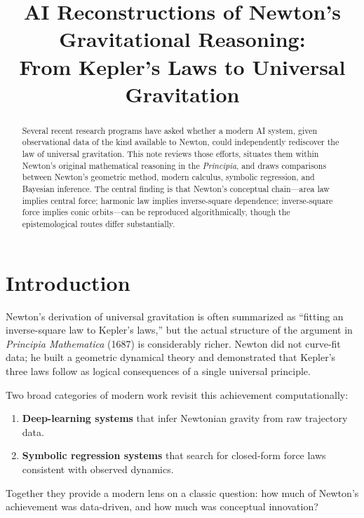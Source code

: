 \documentclass[12pt]{article}
\title{AI Reconstructions of Newton's Gravitational Reasoning:\\
From Kepler's Laws to Universal Gravitation}
\author{}
\date{}
\begin{document}
\maketitle

\begin{abstract}
Several recent research programs have asked whether a modern AI system,
given observational data of the kind available to Newton, could independently
rediscover the law of universal gravitation.
This note reviews those efforts, situates them within Newton's original
mathematical reasoning in the \textit{Principia}, and draws comparisons
between Newton's geometric method, modern calculus, symbolic regression,
and Bayesian inference.
The central finding is that Newton's conceptual chain---area law implies
central force; harmonic law implies inverse-square dependence; inverse-square
force implies conic orbits---can be reproduced algorithmically, though the
epistemological routes differ substantially.
\end{abstract}

\section{Introduction}

Newton's derivation of universal gravitation is often summarized as
``fitting an inverse-square law to Kepler's laws,'' but the actual structure
of the argument in \textit{Principia Mathematica} (1687) is considerably
richer.
Newton did not curve-fit data; he built a geometric dynamical theory and
demonstrated that Kepler's three laws follow as logical consequences of a
single universal principle.

Two broad categories of modern work revisit this achievement computationally:

\begin{enumerate}
  \item \textbf{Deep-learning systems} that infer Newtonian gravity from raw
        trajectory data.
  \item \textbf{Symbolic regression systems} that search for closed-form force
        laws consistent with observed dynamics.
\end{enumerate}

Together they provide a modern lens on a classic question: how much of
Newton's achievement was data-driven, and how much was conceptual innovation?

\end{document}
